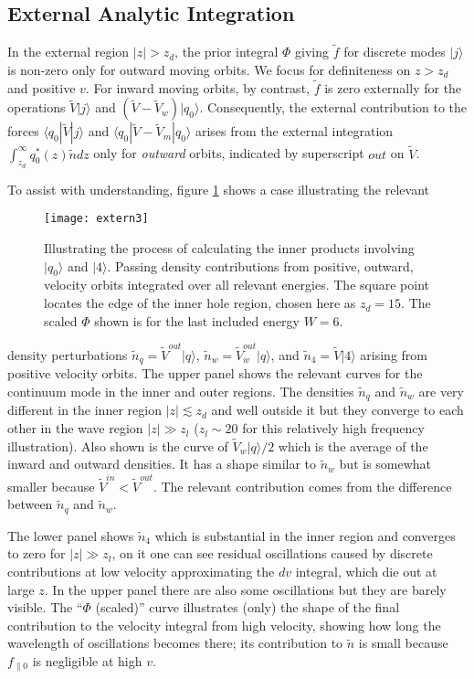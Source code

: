\documentclass{jpp}
\def\ket#1{|#1\rangle}
\def\bra#1{\langle#1}
\begin{document}
\subsection{External Analytic Integration}

In the external region $|z|>z_d$, the prior integral $\Phi$ giving
$\tilde f$ for discrete modes $\ket{j}$ is non-zero only for outward
moving orbits. We focus for definiteness on $z>z_d$ and positive $v$.
For inward moving orbits, by contrast, $\tilde f$ is zero externally
for the operations $\tilde V\ket{j}$ and
$(\tilde V -\tilde V_w)\ket{q_0}$. Consequently, the external
contribution to the forces $\bra{q_0}|\tilde V \ket{j}$ and
$\bra{q_0}|\tilde V -\tilde V_m\ket{q_0}$ arises from the external
integration $\int_{z_d}^\infty q_0^*(z) \tilde n dz$ only for
\emph{outward} orbits, indicated by superscript $out$ on $\tilde V$.

To assist with understanding, figure \ref{externfig2} shows a case
illustrating the relevant
\begin{figure}
  \centering\texttt{[image: extern3]}
  \caption{Illustrating the process of calculating the inner products
    involving $\ket{q_0}$ and $\ket{4}$. Passing density contributions
    from positive, outward, velocity orbits integrated over all
    relevant energies. The square point locates the edge of the inner
    hole region, chosen here as $z_d=15$. The scaled $\Phi$ shown is
    for the last included energy $W=6$.\label{externfig2}}
\end{figure}
density perturbations $\tilde n_q=\tilde V^{out}\ket{q}$,
$\tilde n_w=\tilde V_w^{out}\ket{q}$, and $\tilde n_4=\tilde V\ket{4}$
arising from positive velocity orbits. The upper panel shows the
relevant curves for the continuum mode in the inner and outer regions.
The densities $\tilde n_q$ and $\tilde n_w$ are very different in the
inner region $|z|\lesssim z_d$ and well outside it but they converge to each
other in the wave region $|z|\gg z_l$ ($z_l\sim 20$ for this
relatively high frequency illustration). Also shown is the curve of
$\tilde V_w\ket{q}/2$ which is the average of the inward and
outward densities. It has a shape similar to $\tilde n_w$ but is
somewhat smaller because $\tilde V^{in}< \tilde V^{out}$. The
relevant contribution comes from the difference between $\tilde n_q$
and $\tilde n_w$. 

The lower panel shows $\tilde n_4$ which is substantial in the inner
region and converges to zero for $|z|\gg z_l$, on it one can see
residual oscillations caused by discrete contributions at low velocity
approximating the $dv$ integral, which die out at large $z$. In the
upper panel there are also some oscillations but they are barely
visible. The ``$\Phi$ (scaled)'' curve illustrates (only) the shape of
the final contribution to the velocity integral from high velocity,
showing how long the wavelength of oscillations becomes there; its
contribution to $\tilde n$ is small because $f_{\parallel0}$ is
negligible at high $v$.
\end{document}
